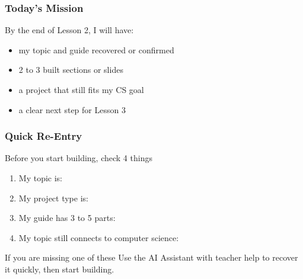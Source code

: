 \documentclass[aspectratio=169]{beamer}
\begin{document}
\begin{frame}[plain]
\frametitle{Today's Mission}
\begin{block}{By the end of Lesson 2, I will have:}
\begin{itemize}
\large
\item my topic and guide recovered or confirmed
\item 2 to 3 built sections or slides
\item a project that still fits my CS goal
\item a clear next step for Lesson 3
\end{itemize}
\end{block}
\vspace{0.15cm}
\begin{center}
\end{center}
\end{frame}

\begin{frame}[plain]
\frametitle{Quick Re-Entry}
\begin{block}{Before you start building, check 4 things}
\begin{enumerate}
\large
\item My topic is:
\item My project type is:
\item My guide has 3 to 5 parts:
\item My topic still connects to computer science:
\end{enumerate}
\end{block}
\vspace{0.15cm}
\begin{block}{If you are missing one of these}
\large Use the AI Assistant with teacher help to recover it quickly, then start building.
\end{block}
\end{frame}
\end{document}
